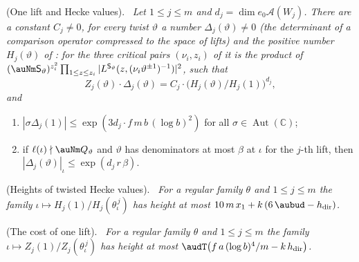 \documentclass[10pt]{amsart}
\theoremstyle{definition}
\theoremstyle{remark}
\newcommand{\C}{\mathbb C}
\providecommand{\auAut}{\operatorname{Aut}}
\providecommand{\auhdir}{h_{\mathrm{dir}}}
\newenvironment{quotedthm}[2]{\par\medskip\noindent\begingroup
  \textbf{#1}#2.\ \itshape\ignorespaces}{\endgroup\par\medskip}
\begin{document}
\begin{quotedthm}{\cite[Proposition~14.41]{P46}}{ (One lift and Hecke values)}
Let $1\le j\le m$ and $d_j=\dim e_0\mathcal A(W_j)$. There are a constant $C_j\ne0$, for every twist
$\vartheta$ a number $\Delta_j(\vartheta)\ne0$ (the determinant of a \emph{comparison operator}
compressed to the space of lifts) and the positive number $H_j(\vartheta)$ of {\cite[(11)]{P54}}: for the three critical pairs $(\nu_i,z_i)$ of {\cite[\S2.7]{P54}} it is the product of $(\auNm\mathsf S_\vartheta)^{z_i^2}\prod_{1\le z\le z_i}|L^{\mathsf S_\vartheta}(z,(\nu_i\vartheta^{\pm1})^{-1})|^2$, such that
\[
Z_j(\vartheta)\cdot\Delta_j(\vartheta)=C_j\cdot\bigl(H_j(\vartheta)/H_j(1)\bigr)^{d_j},
\]
and
\begin{enumerate}
\item[(a)] $|\sigma\Delta_j(1)|\le\exp(3d_j\cdot f\,m\,b\,(\log b)^2)$ for all
$\sigma\in\auAut(\C)$;
\item[(b)] if $\ell(\iota)\nmid\auNm Q_\vartheta$ and $\vartheta$ has denominators at most $\beta$
at $\iota$ for the $j$-th lift, then $|\Delta_j(\vartheta)|_\iota\le\exp(d_j\,r\,\beta)$.
\end{enumerate}
\end{quotedthm}

\begin{quotedthm}{\cite[Proposition~14.42]{P46}}{ (Heights of twisted Hecke values)}
For a regular family $\theta$ and $1\le j\le m$ the family $\iota\mapsto H_j(1)/H_j(\theta_\iota^
{\,j})$ has height at most $10\,m\,x_1+k\,(6\,\aubud-\auhdir)$.
\end{quotedthm}

\begin{quotedthm}{\cite[Proposition~14.43]{P46}}{ (The cost of one lift)}
For a regular family $\theta$ and $1\le j\le m$ the family $\iota\mapsto Z_j(1)/Z_j(\theta_\iota^
{\,j})$ has height at most $\audT\bigl(f\,a\,(\log b)^4/m-k\,\auhdir\bigr)$.
\end{quotedthm}
\end{document}
